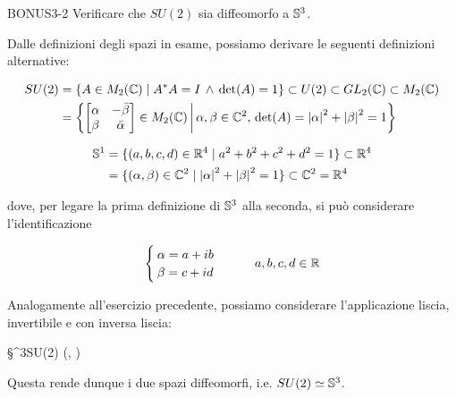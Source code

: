 {BONUS3-2}
{
Verificare che $ SU(2) $ sia diffeomorfo a $ \S^{3} $.
}
{
Dalle definizioni degli spazi in esame, possiamo derivare le seguenti definizioni alternative:

\begin{align}
	\begin{split}
		SU(2) &= \{ A \in M_{2}(\C) \mid A^{*} A = I \, \wedge \, \det(A) = 1 \} \subset U(2) \subset GL_{2}(\C) \subset M_{2}(\C) \\
		&= \left\{ \bmqty{ \alpha & - \bar{\beta} \\ \beta & \bar{\alpha} } \in M_{2}(\C) \st \alpha, \beta \in \C^{2}, \, \det(A) = \abs{\alpha}^{2} + \abs{\beta}^{2} = 1 \right\}
	\end{split}
\end{align}

\begin{align}
	\begin{split}
		\S^{1} &= \{ (a,b,c,d) \in \R^{4} \mid a^{2} + b^{2} + c^{2} + d^{2} = 1 \} \subset \R^{4} \\
		&= \{ (\alpha, \beta) \in \C^{2} \mid \abs{\alpha}^{2} + \abs{\beta}^{2} = 1 \} \subset \C^{2} = \R^{4}
	\end{split}
\end{align}

dove, per legare la prima definizione di $ \S^{3} $ alla seconda, si può considerare l'identificazione

\begin{equation}
	\begin{cases}
		\alpha = a + i b \\
		\beta = c + i d
	\end{cases} %
	\qquad a,b,c,d \in \R
\end{equation}

Analogamente all'esercizio precedente, possiamo considerare l'applicazione liscia, invertibile e con inversa liscia:

\map{\varphi}
	{\S^{3}}{SU(2)}
	{(\alpha, \beta)}{\bmqty{ \alpha & - \bar{\beta} \\ \beta & \bar{\alpha} }}

Questa rende dunque i due spazi diffeomorfi, i.e. $ SU(2) \simeq \S^{3} $.
}


